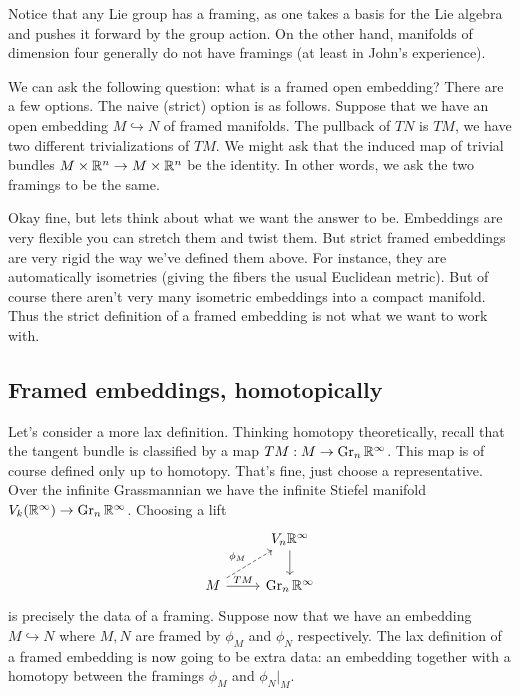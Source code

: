 \documentclass{amsart}
\begin{document}
Notice that any Lie group has a framing, as one takes a basis for the Lie algebra
and pushes it forward by the group action. On the other hand, manifolds of dimension
four generally do not have framings (at least in John's experience).

We can ask the following question: what is a framed open embedding? There are a few options.
The naive (strict) option is as follows. Suppose that we have an open embedding $M\hookrightarrow N$
of framed manifolds. The pullback of $TN$ is $TM$, we have two different trivializations
of $TM$. We might ask that the induced map of trivial bundles $M\times\mathbb{R}^n\to M\times\mathbb{R}^n$
be the identity. In other words, we ask the two framings to be the same.

Okay fine, but lets think about what we want the answer to be. Embeddings are very flexible
you can stretch them and twist them.
But strict framed embeddings are very rigid the way we've defined them above.
For instance, they are automatically isometries (giving the fibers the usual Euclidean metric).
But of course there aren't very many isometric embeddings into a compact manifold.
Thus the strict definition of a framed embedding is not what we want to work with.

\subsection{Framed embeddings, homotopically}

Let's consider a more lax definition. Thinking homotopy theoretically,
recall that the tangent bundle is classified by a map $TM: M\to \operatorname{Gr}_n\mathbb{R}^\infty$. This map is
of course defined only up to homotopy. That's fine, just choose a representative. Over
the infinite Grassmannian we have the infinite Stiefel manifold $V_k(\mathbb{R}^\infty)\to\operatorname{Gr}_n\mathbb{R}^\infty$.
Choosing a lift
\begin{equation*}
    \begin{tikzcd}
        \; & V_n\R^\infty \dar \\
        M \rar{TM}\urar[dashed]{\phi_M} & \Gr_n\R^\infty
    \end{tikzcd}
\end{equation*}
is precisely the data of a framing. 
Suppose now that we have an embedding $M\hookrightarrow N$ where $M,N$ are framed by
$\phi_M$ and $\phi_N$ respectively.
The lax definition of a framed embedding is now going to be extra data: an embedding
together with a homotopy between the framings $\phi_M$ and $\phi_N|_M$.
\end{document}

